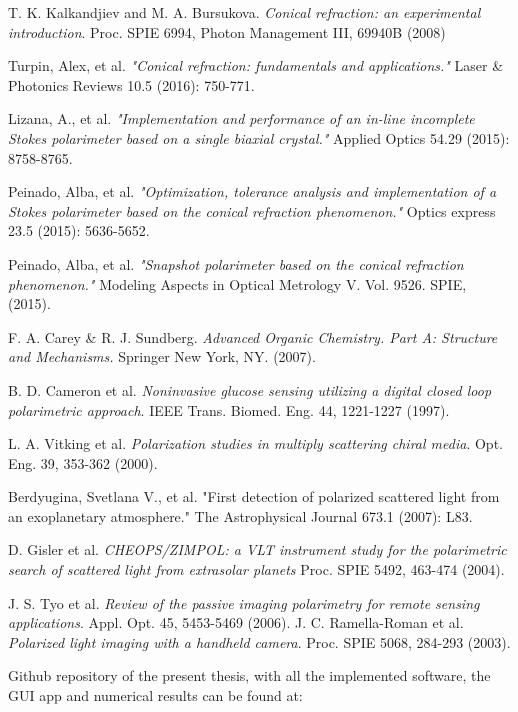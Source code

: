 \documentclass[11pt, a4paper, twoside]{article} %
\begin{document}
\begin{thebibliography}{1}
{
T. K. Kalkandjiev and M. A. Bursukova. {\em Conical refraction: an experimental introduction}. Proc. SPIE 6994, Photon Management III, 69940B (2008)

Turpin, Alex, et al. {\em "Conical refraction: fundamentals and applications."} Laser \& Photonics Reviews 10.5 (2016): 750-771.

Lizana, A., et al. {\em "Implementation and performance of an in-line incomplete Stokes polarimeter based on a single biaxial crystal."} Applied Optics 54.29 (2015): 8758-8765.

Peinado, Alba, et al. {\em "Optimization, tolerance analysis and implementation of a Stokes polarimeter based on the conical refraction phenomenon."} Optics express 23.5 (2015): 5636-5652.

Peinado, Alba, et al. {\em "Snapshot polarimeter based on the conical refraction phenomenon."} Modeling Aspects in Optical Metrology V. Vol. 9526. SPIE, (2015).

F. A. Carey \& R. J. Sundberg. {\em Advanced Organic Chemistry. Part A: Structure and Mechanisms.} Springer New York, NY. (2007).

B. D. Cameron et al. {\em Noninvasive glucose sensing utilizing a digital closed loop polarimetric approach}. IEEE Trans. Biomed. Eng. 44, 1221-1227 (1997).

L. A. Vitking et al. {\em Polarization studies in multiply scattering chiral media}. Opt. Eng. 39, 353-362 (2000).

Berdyugina, Svetlana V., et al. "First detection of polarized scattered light from an exoplanetary atmosphere." The Astrophysical Journal 673.1 (2007): L83.

D. Gisler et al. {\em CHEOPS/ZIMPOL: a VLT instrument study for the polarimetric search of scattered light from extrasolar planets} Proc. SPIE 5492, 463-474 (2004).

J. S. Tyo et al. {\em  Review of the passive imaging polarimetry for remote sensing applications}. Appl. Opt. 45, 5453-5469 (2006).
J. C. Ramella-Roman et al. {\em Polarized light imaging with a handheld camera}. Proc. SPIE 5068, 284-293 (2003).

Github repository of the present thesis, with all the implemented software, the GUI app and numerical results can be found at:

}
\end{thebibliography}
\end{document}
